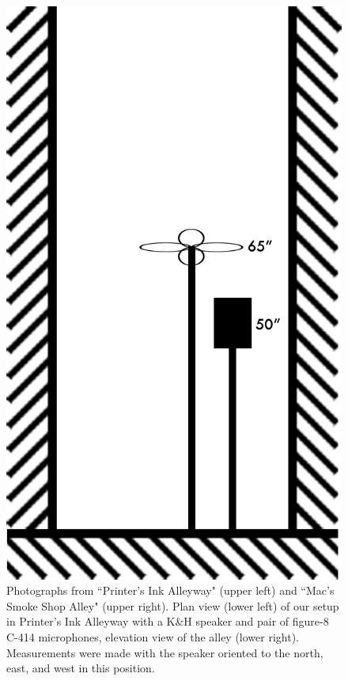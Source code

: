 \documentclass{aes137}
\begin{document}
\begin{figure}
\begin{minipage}[b]{0.41\linewidth}
\includegraphics[width=\textwidth]{images/alleyway_lookingdown.png}
\end{minipage}

\caption{Photographs from ``Printer's Ink Alleyway" (upper left) and ``Mac's Smoke Shop Alley" (upper right). Plan view (lower left) of our setup in Printer's Ink Alleyway
  with a K\&H speaker and pair of figure-8 C-414 microphones,
  elevation view of the alley (lower right). Measurements were made with the
  speaker oriented to the north, east, and west in this position.}
\end{figure}
\end{document}

